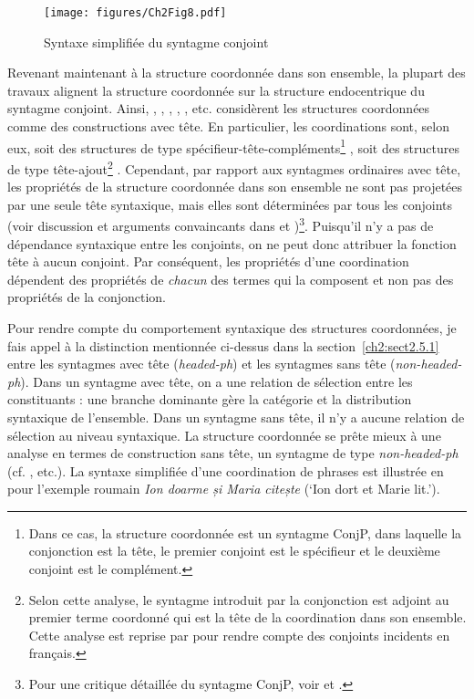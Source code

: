 \begin{figure} 

   \texttt{[image: figures/Ch2Fig8.pdf]}

\caption{Syntaxe simplifiée du syntagme conjoint}
\label{ch2:fig8}
\end{figure}

\largerpage[-1]
Revenant maintenant à la structure coordonnée dans son ensemble, la plupart des travaux alignent la structure coordonnée sur la structure endocentrique du syntagme conjoint. Ainsi, \citet{Munn1993}, \citet{Kayne1994}, \citet{Johannessen1998}, \citet{Camacho2003}, \citet{Rebuschi2005}, etc. considèrent les structures coordonnées comme des constructions avec tête. En particulier, les coordinations sont, selon eux, soit des structures de type spécifieur-tête-compléments\footnote{
 Dans ce cas, la structure coordonnée est un syntagme ConjP, dans laquelle la conjonction est la tête, le premier conjoint est le spécifieur et le deuxième conjoint est le complément.} \citep{Kayne1994,Johannessen1998}, soit des structures de type tête-ajout\footnote{
 Selon cette analyse, le syntagme introduit par la conjonction est adjoint au premier terme coordonné qui est la tête de la coordination dans son ensemble. Cette analyse est reprise par \citet{Abeille2005} pour rendre compte des conjoints incidents en français.} \citep{Munn1993}. Cependant, par rapport aux syntagmes ordinaires avec tête, les propriétés de la structure coordonnée dans son ensemble ne sont pas projetées par une seule tête syntaxique, mais elles sont déterminées par tous les conjoints (voir discussion et arguments convaincants dans \citealt{Borsley1994} et \citealt{Borsley2005})\footnote{
 Pour une critique détaillée du syntagme ConjP, voir \citet{Chaves2007} et \citet{Mouret2007}.}. Puisqu’il n’y a pas de dépendance syntaxique entre les conjoints, on ne peut donc attribuer la fonction tête à aucun conjoint. Par conséquent, les propriétés d’une coordination dépendent des propriétés de \textit{chacun} des termes qui la composent et non pas des propriétés de la conjonction.

Pour rendre compte du comportement syntaxique des structures coordonnées, je fais appel à la distinction mentionnée ci-dessus dans la section~\ref{ch2:sect2.5.1} entre les syntagmes avec tête (\textit{headed-ph}) et les syntagmes sans tête (\textit{non-headed-ph}). Dans un syntagme avec tête, on a une relation de sélection entre les constituants : une branche dominante gère la catégorie et la distribution syntaxique de l’ensemble. Dans un syntagme sans tête, il n’y a aucune relation de sélection au niveau syntaxique. La structure coordonnée se prête mieux à une analyse en termes de construction sans tête, {\cad} un syntagme de type \textit{non-headed-ph} (cf. \citealt{Abeille2003,Abeille2005,Mouret2006,Mouret2007}, etc.). La syntaxe simplifiée d’une coordination de phrases est illustrée en  pour l’exemple roumain \textit{Ion doarme și Maria citește} (‘Ion dort et Marie lit.’). 

